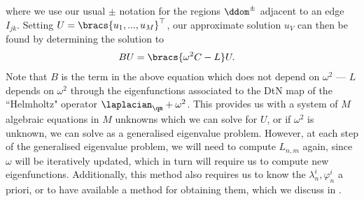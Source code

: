where we use our usual $\pm$ notation for the regions $\ddom^{\pm}$ adjacent to an edge $I_{jk}$.
Setting $U = \bracs{u_1, ..., u_M}^\top$, our approximate solution $u_V$ can then be found by determining the solution to
\begin{align*}
	B U &= \bracs{\omega^2 C - L} U.
\end{align*}
Note that $B$ is the term in the above equation which does not depend on $\omega^2$ --- $L$ depends on $\omega^2$ through the eigenfunctions associated to the DtN map of the ``Helmholtz" operator $\laplacian_{\qm}+\omega^2$.
This provides us with a system of $M$ algebraic equations in $M$ unknowns which we can solve for $U$, or if $\omega^2$ is unknown, we can solve as a generalised eigenvalue problem.
However, at each step of the generalised eigenvalue problem, we will need to compute $L_{n,m}$ again, since $\omega$ will be iteratively updated, which in turn will require us to compute new eigenfunctions.
Additionally, this method also requires us to know the $\lambda_n^i, \varphi_n^i$ a priori, or to have available a method for obtaining them, which we discuss in .

